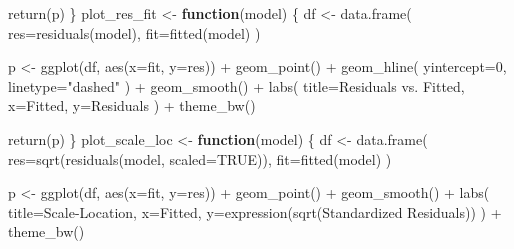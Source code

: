 \documentclass[
  11pt,
]{article}
\newenvironment{Shaded}{\begin{snugshade}}{\end{snugshade}}
\newcommand{\AttributeTok}[1]{\textcolor[rgb]{0.77,0.63,0.00}{#1}}
\newcommand{\ConstantTok}[1]{\textcolor[rgb]{0.00,0.00,0.00}{#1}}
\newcommand{\ControlFlowTok}[1]{\textcolor[rgb]{0.13,0.29,0.53}{\textbf{#1}}}
\newcommand{\DecValTok}[1]{\textcolor[rgb]{0.00,0.00,0.81}{#1}}
\newcommand{\FunctionTok}[1]{\textcolor[rgb]{0.00,0.00,0.00}{#1}}
\newcommand{\NormalTok}[1]{#1}
\newcommand{\OtherTok}[1]{\textcolor[rgb]{0.56,0.35,0.01}{#1}}
\newcommand{\SpecialCharTok}[1]{\textcolor[rgb]{0.00,0.00,0.00}{#1}}
\newcommand{\StringTok}[1]{\textcolor[rgb]{0.31,0.60,0.02}{#1}}
\begin{document}
\begin{Shaded}
\begin{Highlighting}[]
  \FunctionTok{return}\NormalTok{(p)}
\NormalTok{\}}
\NormalTok{plot\_res\_fit }\OtherTok{\textless{}{-}} \ControlFlowTok{function}\NormalTok{(model) \{}
\NormalTok{  df }\OtherTok{\textless{}{-}} \FunctionTok{data.frame}\NormalTok{(}
    \AttributeTok{res=}\FunctionTok{residuals}\NormalTok{(model),}
    \AttributeTok{fit=}\FunctionTok{fitted}\NormalTok{(model)}
\NormalTok{  )}

\NormalTok{  p }\OtherTok{\textless{}{-}} \FunctionTok{ggplot}\NormalTok{(df, }\FunctionTok{aes}\NormalTok{(}\AttributeTok{x=}\NormalTok{fit, }\AttributeTok{y=}\NormalTok{res)) }\SpecialCharTok{+}
    \FunctionTok{geom\_point}\NormalTok{() }\SpecialCharTok{+}
    \FunctionTok{geom\_hline}\NormalTok{(}
      \AttributeTok{yintercept=}\DecValTok{0}\NormalTok{,}
      \AttributeTok{linetype=}\StringTok{"dashed"}
\NormalTok{    ) }\SpecialCharTok{+}
    \FunctionTok{geom\_smooth}\NormalTok{() }\SpecialCharTok{+}
    \FunctionTok{labs}\NormalTok{(}
      \AttributeTok{title=}\StringTok{\textquotesingle{}Residuals vs. Fitted\textquotesingle{}}\NormalTok{,}
      \AttributeTok{x=}\StringTok{\textquotesingle{}Fitted\textquotesingle{}}\NormalTok{,}
      \AttributeTok{y=}\StringTok{\textquotesingle{}Residuals\textquotesingle{}}
\NormalTok{    ) }\SpecialCharTok{+} \FunctionTok{theme\_bw}\NormalTok{()}

  \FunctionTok{return}\NormalTok{(p)}
\NormalTok{\}}
\NormalTok{plot\_scale\_loc }\OtherTok{\textless{}{-}} \ControlFlowTok{function}\NormalTok{(model) \{}
\NormalTok{  df }\OtherTok{\textless{}{-}} \FunctionTok{data.frame}\NormalTok{(}
    \AttributeTok{res=}\FunctionTok{sqrt}\NormalTok{(}\FunctionTok{residuals}\NormalTok{(model, }\AttributeTok{scaled=}\ConstantTok{TRUE}\NormalTok{)),}
    \AttributeTok{fit=}\FunctionTok{fitted}\NormalTok{(model)}
\NormalTok{  )}

\NormalTok{  p }\OtherTok{\textless{}{-}} \FunctionTok{ggplot}\NormalTok{(df, }\FunctionTok{aes}\NormalTok{(}\AttributeTok{x=}\NormalTok{fit, }\AttributeTok{y=}\NormalTok{res)) }\SpecialCharTok{+}
    \FunctionTok{geom\_point}\NormalTok{() }\SpecialCharTok{+}
    \FunctionTok{geom\_smooth}\NormalTok{() }\SpecialCharTok{+}
    \FunctionTok{labs}\NormalTok{(}
      \AttributeTok{title=}\StringTok{\textquotesingle{}Scale{-}Location\textquotesingle{}}\NormalTok{,}
      \AttributeTok{x=}\StringTok{\textquotesingle{}Fitted\textquotesingle{}}\NormalTok{,}
      \AttributeTok{y=}\FunctionTok{expression}\NormalTok{(}\FunctionTok{sqrt}\NormalTok{(}\StringTok{\textquotesingle{}Standardized Residuals\textquotesingle{}}\NormalTok{))}
\NormalTok{    ) }\SpecialCharTok{+} \FunctionTok{theme\_bw}\NormalTok{()}


\end{Highlighting}
\end{Shaded}
\end{document}
